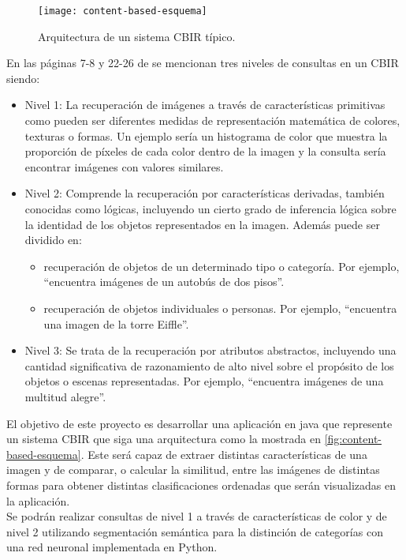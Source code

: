 \begin{figure}[htpb]
  \centering
  \texttt{[image: content-based-esquema]}
  \caption{Arquitectura de un sistema CBIR típico. \cite{content-based}}
  \label{fig:content-based-esquema}
\end{figure}

En las páginas 7-8 y 22-26 de \cite{report:39} se mencionan tres niveles de consultas en un CBIR siendo:

\begin{itemize}
\item Nivel 1: La recuperación de imágenes a través de características primitivas como pueden ser diferentes medidas de representación matemática de colores, texturas o formas. Un ejemplo sería un histograma de color que muestra la proporción de píxeles de cada color dentro de la imagen y la consulta sería encontrar imágenes con valores similares.
\item Nivel 2: Comprende la recuperación por características derivadas, también conocidas como lógicas, incluyendo un cierto grado de inferencia lógica sobre la identidad de los objetos representados en la imagen. Además puede ser dividido en:
\begin{itemize}
\item recuperación de objetos de un determinado tipo o categoría. Por ejemplo, ``encuentra imágenes de un autobús de dos pisos''.
\item recuperación de objetos individuales o personas. Por ejemplo, ``encuentra una imagen de la torre Eiffle''.
\end{itemize}
\item Nivel 3: Se trata de la recuperación por atributos abstractos, incluyendo una cantidad significativa de razonamiento de alto nivel sobre el propósito de los objetos o escenas representadas. Por ejemplo, ``encuentra imágenes de una multitud alegre''.
\end{itemize}

El objetivo de este proyecto es desarrollar una aplicación en java que represente un sistema CBIR que siga una arquitectura como la mostrada en \autoref{fig:content-based-esquema}. Este será capaz de extraer distintas características de una imagen y de comparar, o calcular la similitud, entre las imágenes de distintas formas para obtener distintas clasificaciones ordenadas que serán visualizadas en la aplicación. \\

Se podrán realizar consultas de nivel 1 a través de características de color y de nivel 2 utilizando segmentación semántica para la distinción de categorías con una red neuronal implementada en Python.

